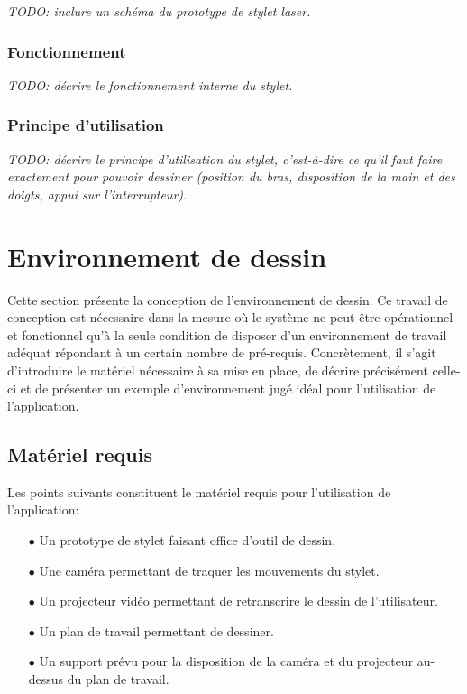 \documentclass[11pt,a4paper,oldfontcommands]{memoir}
\begin{document}
\textit{TODO: inclure un schéma du prototype de stylet laser.}

\subsubsection{Fonctionnement}

\textit{TODO: décrire le fonctionnement interne du stylet.}

\subsubsection{Principe d'utilisation}

\textit{TODO: décrire le principe d'utilisation du stylet, c'est-à-dire ce qu'il faut faire exactement pour pouvoir dessiner (position du bras, disposition de la main et des doigts, appui sur l'interrupteur).}

\newpage

\section{Environnement de dessin}

Cette section présente la conception de l'environnement de dessin. Ce travail de conception est nécessaire dans la mesure où le système ne peut être opérationnel et fonctionnel qu'à la seule condition de disposer d'un environnement de travail adéquat répondant à un certain nombre de pré-requis. Concrètement, il s'agit d'introduire le matériel nécessaire à sa mise en place, de décrire précisément celle-ci et de présenter un exemple d'environnement jugé idéal pour l'utilisation de l'application.

\subsection{Matériel requis}

Les points suivants constituent le matériel requis pour l'utilisation de l'application:

\begin{itemize}
\item[$\bullet$] Un prototype de stylet faisant office d'outil de dessin.
\item[$\bullet$] Une caméra permettant de traquer les mouvements du stylet.
\item[$\bullet$] Un projecteur vidéo permettant de retranscrire le dessin de l'utilisateur.
\item[$\bullet$] Un plan de travail permettant de dessiner.
\item[$\bullet$] Un support prévu pour la disposition de la caméra et du projecteur au-dessus du plan de travail.
\end{itemize}
\end{document}
